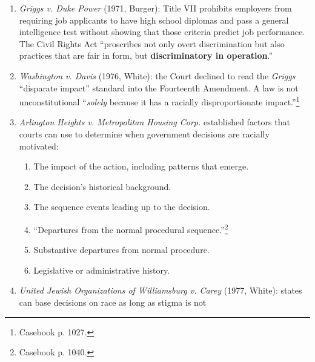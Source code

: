 \begin{enumerate}
\begin{enumerate}
\begin{enumerate}
            twenty-eight-sided figure.''\footnote{Casebook p. 1023.} The sole 
            purpose was to segregate voters by race.
        \end{enumerate}
        \item \emph{Gaston County v. United States}---Transferred De 
        Jure Discrimination: a voting literacy test disproportionately 
        disenfranchised blacks. The Court held that years of inferior 
        education meant that blacks were less equipped to pass the test, so 
        the test was discriminatory.
    \end{enumerate}
    \item \emph{Griggs v. Duke Power} (1971, Burger): Title VII prohibits 
    employers from requiring job applicants to have high school diplomas and 
    pass a general intelligence test without showing that those criteria 
    predict job performance. The Civil Rights Act ``proscribes not only overt 
    discrimination but also practices that are fair in form, but 
    \textbf{discriminatory in operation}.'' %
    \item \emph{Washington v. Davis} (1976, White): the Court declined to read 
    the \emph{Griggs} ``disparate impact'' standard into the Fourteenth 
    Amendment. A law is not unconstitutional ``\emph{solely} because it has a 
    racially disproportionate impact.''\footnote{Casebook p. 1027.}
    \item \emph{Arlington Heights v. Metropolitan Housing Corp.} established 
    factors that courts can use to determine when government decisions are 
    racially motivated:
    \begin{enumerate}
        \item The impact of the action, including patterns that emerge.
        \item The decision's historical background.
        \item The sequence events leading up to the decision.
        \item ``Departures from the normal procedural 
        sequence.''\footnote{Casebook p. 1040.}
        \item Substantive departures from normal procedure.
        \item Legislative or administrative history.
    \end{enumerate}
    \item \emph{United Jewish Organizations of Williamsburg v. Carey} (1977, 
    White): states can base decisions on race as long as stigma is not 

\end{enumerate}
